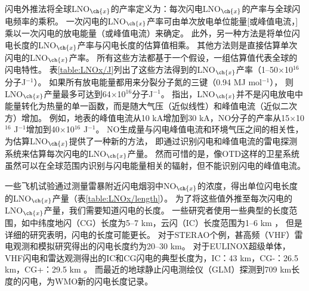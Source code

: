 闪电外推法将全球LNO$_{\ch{x}}$的产率定义为：每次闪电LNO$_{\ch{x}}$的产率与全球闪电频率的乘积\citep{Lawrence.1995}。
一次闪电的LNO$_{\ch{x}}$产率可由单次放电单位能量[或峰值电流，\citet{Wang.1998}]乘以一次闪电的放电能量（或峰值电流）来确定。
此外，另一种方法是将单位闪电长度的LNO$_{\ch{x}}$产率与闪电长度的估算值相乘。
其他方法则是直接估算单次闪电的LNO$_{\ch{x}}$产率。
所有这些方法都基于一个假设，一组估算值代表全球的闪电特性。
表\ref{table:LNOx/J}列出了这些方法得到的LNO$_{\ch{x}}$产率（1--50$\times$10$^{16}$分子J$^{-1}$）。
如果所有放电能量都用来分裂分子氮的三键（0.94 MJ mol$^{-1}$），
则LNO$_{\ch{x}}$产量最多可达到64$\times$10$^{16}$分子J$^{-1}$。
\citet{Wang.1998}指出，LNO$_{\ch{x}}$并不是闪电放电中能量转化为热量的单一函数，而是随大气压（近似线性）和峰值电流（近似二次方）增加。
例如，地表的峰值电流从10 kA增加到30 kA，NO分子的产率从15$\times$10$^{16}$ J$^{-1}$增加到40$\times$10$^{16}$ J$^{-1}$。
NO生成量与闪电峰值电流和环境气压之间的相关性，为估算LNO$_{\ch{x}}$提供了一种新的方法，
即通过识别闪电和峰值电流的雷电探测系统来估算每次闪电的LNO$_{\ch{x}}$产量。
然而可惜的是，像OTD这样的卫星系统虽然可以在全球范围内识别与闪电能量相关的辐射\citep{Baker.1999}，但不能识别闪电的峰值电流。


一些飞机试验通过测量雷暴附近闪电烟羽中NO$_{\ch{x}}$的浓度，得出单位闪电长度的LNO$_{\ch{x}}$产量（表\ref{table:LNOx/length}）。
为了将这些值外推至每次闪电的LNO$_{\ch{x}}$产量，我们需要知道闪电的长度。
一些研究者使用一些典型的长度范围，如中纬度地闪（CG）长度为5--7 km，云闪（IC）长度范围为1--6 km \citep{Price.1997b}，
但是详细的研究表明，闪电的长度可能更长\citep{Defer.2001,Thery.2001,Peterson.2020b}。
对于STERAO个例，甚高频（VHF）雷电观测和模拟研究得出的闪电长度约为20--30 km\citep{Defer.2001}。
对于EULINOX超级单体，VHF闪电和雷达观测得出的IC和CG闪电的典型长度为，IC：43 km，CG-：26.5 km，CG+：29.5 km \citep{Dotzek.2000}。
而最近的地球静止闪电测绘仪（GLM）探测到709 km长度的闪电，为WMO新的闪电长度记录\citep{Peterson.2020b}。



